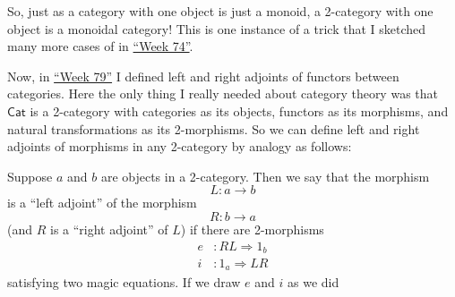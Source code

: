 \documentclass{article}
\begin{document}
So, just as a category with one object is just a monoid, a 2-category
with one object is a monoidal category! This is one instance of a trick
that I sketched many more cases of in \protect\hyperlink{week74}{``Week
74''}.

Now, in \protect\hyperlink{week79}{``Week 79''} I defined left and right
adjoints of functors between categories. Here the only thing I really
needed about category theory was that \(\mathsf{Cat}\) is a 2-category
with categories as its objects, functors as its morphisms, and natural
transformations as its 2-morphisms. So we can define left and right
adjoints of morphisms in any 2-category by analogy as follows:

Suppose \(a\) and \(b\) are objects in a 2-category. Then we say that
the morphism \[L\colon a\to b\] is a ``left adjoint'' of the morphism
\[R\colon b\to a\] (and \(R\) is a ``right adjoint'' of \(L\)) if there
are 2-morphisms \[
  \begin{aligned}
    e&\colon RL\Rightarrow 1_b
  \\i&\colon 1_a\Rightarrow LR
  \end{aligned}
\] satisfying two magic equations. If we draw \(e\) and \(i\) as we did
\end{document}
